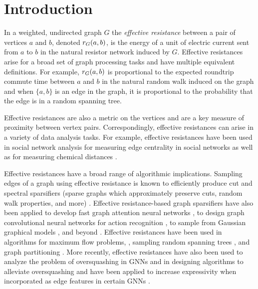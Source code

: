 \section{Introduction}\label{section:intro}
In a weighted, undirected graph $G$ the \emph{effective resistance} between a pair of vertices $a$ and $b$, denoted ${r}_{G}(a,b)$, is the energy of a unit of electric current sent from $a$ to $b$ in the natural resistor network induced by $G$. Effective resistances arise for a broad set of graph processing tasks and have multiple equivalent definitions. For example, ${r}_{G}(a,b)$ is proportional to the expected roundtrip commute time between $a$ and $b$ in the natural random walk induced on the graph and when $\{a,b\}$ is an edge in the graph, it is proportional to the probability that the edge is in a random spanning tree.

Effective resistances are also a metric on the vertices \cite{Madry_2014, Devriendt_2022} and are a key measure of proximity between vertex pairs. Correspondingly, effective resistances can arise in a variety of data analysis tasks. For example, effective resistances have been used in social network analysis for measuring edge centrality in social networks \cite{kirchoff} as well as for measuring chemical distances \cite{Klein_1993}.  

Effective resistances have a broad range of algorithmic implications. Sampling edges of a graph using effective resistance is known to efficiently produce cut and spectral sparsifiers (sparse graphs which approximately preserve cuts, random walk properties, and more) \cite{spielman2009graph, lee2015constructing, durfee2019fully}. Effective resistance-based graph sparsifiers have also been applied to develop fast graph attention neural networks \cite{srinivasa2020fast}, to design graph convolutional neural networks for action recognition \cite{AHMAD2021389}, to sample from Gaussian graphical models \cite{pmlr-v40-Cheng15}, and beyond \cite{pmlr-v80-calandriello18a, Mercier_2022}. Effective resistances have been used in algorithms for maximum flow problems, \cite{christiano2010electrical, madry2013navigating, madry2016computing, van2022faster, van2021minimum, lee2014path, van2022faster}, sampling random spanning trees \cite{durfee2017sampling,schild2018, madry2014fast}, and graph partitioning \cite{alev2017graph, zhao2019}. More recently, effective resistances have also been used to analyze the problem of oversquashing in GNNs and in designing algorithms to alleviate oversquashing \cite{digiovanni2023oversquashing, Banerjee2022, black2023understanding} and have been applied to increase expressivity when incorporated as edge features in certain GNNs \cite{velingker2022affinityaware}.


